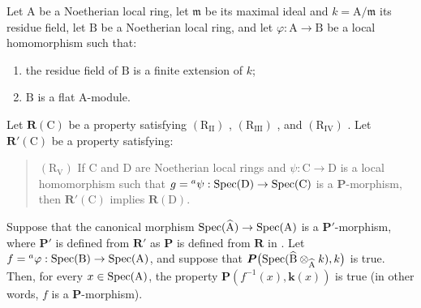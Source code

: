 \begin{corollary}[7.5.2]
\label{IV.7.5.2}
Let $\mathrm{A}$ be a Noetherian local ring, let $\mathfrak{m}$ be its maximal ideal and $k=\mathrm{A}/\mathfrak{m}$ its residue field, let $\mathrm{B}$ be a Noetherian local ring, and let $\varphi:\mathrm{A}\to\mathrm{B}$ be a local homomorphism such that:
\begin{enumerate}[label=(\roman*)]
  \item the residue field of $\mathrm{B}$ is a finite extension of $k$;
  \item $\mathrm{B}$ is a flat $\mathrm{A}$-module.
\end{enumerate}
Let $\boldsymbol{R}(\mathrm{C})$ be a property satisfying $(\mathrm{R}_{\mathrm{II}})$ , $(\mathrm{R}_{\mathrm{III}})$ , and $(\mathrm{R}_{\mathrm{IV}})$ . Let $\boldsymbol{R}'(\mathrm{C})$ be a property satisfying:
\begin{quote}
$(\mathrm{R}_{\mathrm{V}})$ If $\mathrm{C}$ and $\mathrm{D}$ are Noetherian local rings and $\psi:\mathrm{C}\to\mathrm{D}$ is a local homomorphism such that $g={}^a\psi:\operatorname{Spec}(\mathrm{D})\to\operatorname{Spec}(\mathrm{C})$ is a $\boldsymbol{P}$-morphism, then $\boldsymbol{R}'(\mathrm{C})$ implies $\boldsymbol{R}(\mathrm{D})$.
\end{quote}
Suppose that the canonical morphism $\operatorname{Spec}(\widehat{\mathrm{A}})\to\operatorname{Spec}(\mathrm{A})$ is a $\boldsymbol{P}'$-morphism, where $\boldsymbol{P}'$ is defined from $\boldsymbol{R}'$ as $\boldsymbol{P}$ is defined from $\boldsymbol{R}$ in . Let $f={}^a\varphi:\operatorname{Spec}(\mathrm{B})\to\operatorname{Spec}(\mathrm{A})$, and suppose that $\boldsymbol{P}\bigl(\operatorname{Spec}(\widehat{\mathrm{B}}\otimes_{\widehat{\mathrm{A}}}k),k\bigr)$
is true. Then, for every $x\in\operatorname{Spec}(\mathrm{A})$, the property $\boldsymbol{P}(f^{-1}(x),\boldsymbol{k}(x))$ is true \textup{(in other words, $f$ is a $\boldsymbol{P}$-morphism)}.
\end{corollary}

